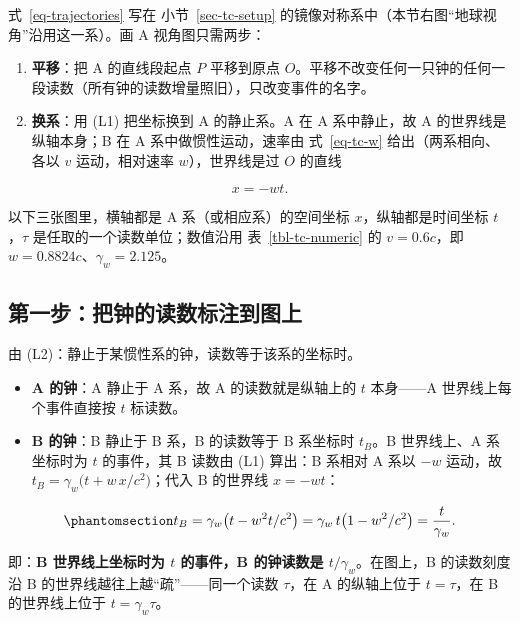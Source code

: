 \documentclass[
  chinese,
  a4paper,
  UTF8,
  12pt,
  oneside,
  openany]{ctexbook}
\providecommand{\tightlist}{%
  \setlength{\itemsep}{0pt}\setlength{\parskip}{0pt}}
\theoremstyle{plain}
\theoremstyle{plain}
\theoremstyle{plain}
\theoremstyle{definition}
\theoremstyle{plain}
\theoremstyle{plain}
\theoremstyle{remark}
\begin{document}
式~\ref{eq-trajectories} 写在 小节~\ref{sec-tc-setup}
的镜像对称系中（本节右图``地球视角''沿用这一系）。画 A 视角图只需两步：

\begin{enumerate}
\def\labelenumi{\arabic{enumi}.}
\tightlist
\item
  \textbf{平移}：把 A 的直线段起点 \(P\) 平移到原点
  \(O\)。平移不改变任何一只钟的任何一段读数（所有钟的读数增量照旧），只改变事件的名字。
\item
  \textbf{换系}：用 (L1) 把坐标换到 A 的静止系。A 在 A 系中静止，故 A
  的世界线是纵轴本身；B 在 A 系中做惯性运动，速率由 式~\ref{eq-tc-w}
  给出（两系相向、各以 \(v\) 运动，相对速率 \(w\)），世界线是过 \(O\)
  的直线
\end{enumerate}

\[
x=-wt.
\]

以下三张图里，横轴都是 A 系（或相应系）的空间坐标
\(x\)，纵轴都是时间坐标 \(t\)，\(\tau\) 是任取的一个读数单位；数值沿用
表~\ref{tbl-tc-numeric} 的 \(v=0.6c\)，即
\(w=0.8824c\)、\(\gamma_w=2.125\)。

\subsection{第一步：把钟的读数标注到图上}\label{ux7b2cux4e00ux6b65ux628aux949fux7684ux8bfbux6570ux6807ux6ce8ux5230ux56feux4e0a}

由 (L2)：静止于某惯性系的钟，读数等于该系的坐标时。

\begin{itemize}
\tightlist
\item
  \textbf{A 的钟}：A 静止于 A 系，故 A 的读数就是纵轴上的 \(t\)
  本身------A 世界线上每个事件直接按 \(t\) 标读数。
\item
  \textbf{B 的钟}：B 静止于 B 系，B 的读数等于 B 系坐标时 \(t_B\)。B
  世界线上、A 系坐标时为 \(t\) 的事件，其 B 读数由 (L1) 算出：B 系相对 A
  系以 \(-w\) 运动，故 \(t_B=\gamma_w\bigl(t+w\,x/c^{2}\bigr)\)；代入 B
  的世界线 \(x=-wt\)：
\end{itemize}

\begin{equation}\protect\phantomsection\label{eq-tc-Bclock}{
t_B=\gamma_w\bigl(t-w^{2}t/c^{2}\bigr)=\gamma_w\,t\bigl(1-w^{2}/c^{2}\bigr)=\frac{t}{\gamma_w}.
}\end{equation}

即：\textbf{B 世界线上坐标时为 \(t\) 的事件，B 的钟读数是
\(t/\gamma_w\)}。在图上，B 的读数刻度沿 B
的世界线越往上越``疏''------同一个读数 \(\tau\)，在 A 的纵轴上位于
\(t=\tau\)，在 B 的世界线上位于 \(t=\gamma_w\tau\)。
\end{document}
